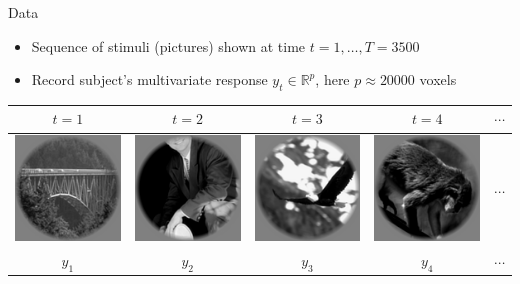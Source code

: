 \documentclass[final]{beamer}
\newlength{\onecolwid}
\begin{document}
\begin{frame}[t]
\begin{columns}[t]
\begin{column}{\onecolwid}
\begin{block}{Data}
\begin{itemize}
\item Sequence of stimuli (pictures) shown at time $t = 1,\hdots, T = 3500$
\item Record subject's multivariate response $y_t \in \mathbb{R}^p$, here $p \approx 20000$ voxels
\end{itemize}

\begin{center}
\begin{tabular}{ccccc}
$t = 1$ & $t = 2$ & $t = 3$ & $t = 4$ & $\cdots$\\ \hline
\includegraphics[scale = 0.8]{img1.png} &
\includegraphics[scale = 0.8]{img2.png} &
\includegraphics[scale = 0.8]{img3.png} &
\includegraphics[scale = 0.8]{img4.png} & $\cdots$\\ \hline
$y_1$ & $y_2$ & $y_3$ & $y_4$ & $\cdots$\\ \hline

\end{tabular}
\end{center}
\end{block}
\end{column}
\end{columns}
\end{frame}
\end{document}
